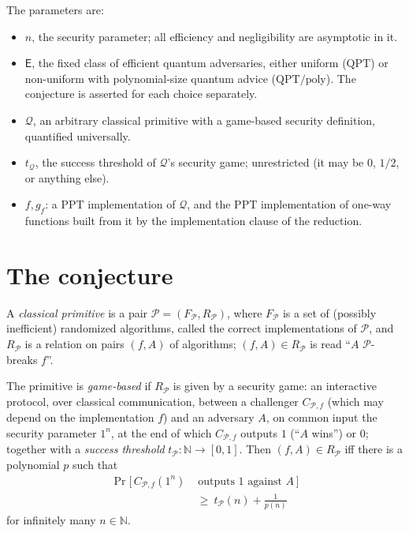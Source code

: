 \documentclass{aicr-conjecture}
\newcommand{\Pc}{\mathcal{P}}
\newcommand{\Qc}{\mathcal{Q}}
\newcommand{\Es}{\mathsf{E}}
\newcommand{\PPT}{\mathrm{PPT}}
\newcommand{\QPT}{\mathrm{QPT}}
\newcommand{\QPTpoly}{\mathrm{QPT}/\mathrm{poly}}
\begin{document}
The parameters are:
\begin{itemize}
\item $n$, the security parameter; all efficiency and negligibility are
  asymptotic in it.
\item $\Es$, the fixed class of efficient quantum adversaries, either
  uniform ($\QPT$) or non-uniform with polynomial-size quantum advice
  ($\QPTpoly$). The conjecture is asserted for each choice separately.
\item $\Qc$, an arbitrary classical primitive with a game-based security
  definition, quantified universally.
\item $t_{\Qc}$, the success threshold of $\Qc$'s security game;
  unrestricted (it may be $0$, $1/2$, or anything else).
\item $f, g_f$: a $\PPT$ implementation of $\Qc$, and the $\PPT$
  implementation of one-way functions built from it by the
  implementation clause of the reduction.
\end{itemize}

\section{The conjecture}\label{sec:conjectures}

\begin{definition}\label{def:prim}
A \emph{classical primitive} is a pair $\Pc = (F_{\Pc}, R_{\Pc})$, where
$F_{\Pc}$ is a set of (possibly inefficient) randomized algorithms,
called the correct implementations of $\Pc$, and $R_{\Pc}$ is a relation
on pairs $(f, A)$ of algorithms; $(f,A) \in R_{\Pc}$ is read ``$A$
$\Pc$-breaks $f$''.

The primitive is \emph{game-based} if $R_{\Pc}$ is given by a security
game: an interactive protocol, over classical communication, between a
challenger $C_{\Pc,f}$ (which may depend on the implementation $f$) and
an adversary $A$, on common input the security parameter $1^n$, at the
end of which $C_{\Pc,f}$ outputs $1$ (``$A$ wins'') or $0$; together
with a \emph{success threshold} $t_{\Pc} : \mathbb{N} \to [0,1]$. Then
$(f,A) \in R_{\Pc}$ iff there is a polynomial $p$ such that
\begin{align*}
  \Pr\big[\,C_{\Pc,f}(1^n)&\text{ outputs } 1
    \text{ against } A\,\big]\\
  &\ \ge\ t_{\Pc}(n) + \tfrac{1}{p(n)}
\end{align*}
for infinitely many $n \in \mathbb{N}$.
\end{definition}
\end{document}
